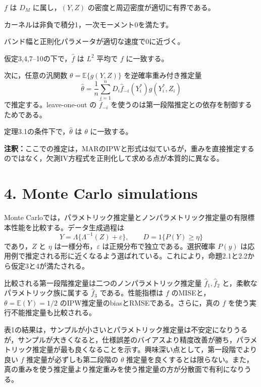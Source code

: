 \documentclass[10pt,a4paper]{article}
\newcommand{\E}{\mathbb{E}}
\newcommand{\note}[1]{\par\smallskip\noindent\textbf{注釈：}#1\par\smallskip}
\begin{document}
\begin{description}[leftmargin=3.2em]
\item[仮定8] $f$ は $D_M$ に属し，$(Y,Z)$ の密度と周辺密度が適切に有界である。
\item[仮定9] カーネルは非負で積分1，一次モーメント0を満たす。
\item[仮定10] バンド幅と正則化パラメータが適切な速度で0に近づく。
\item[定理3.1] 仮定3,4,7--10の下で，$\widehat f$ は $L^2$ 平均で $f$ に一致する。
\end{description}

次に，任意の汎関数 $\theta=\E\{g(Y,Z)\}$ を逆確率重み付き推定量
\[
\widehat\theta=\frac1n\sum_{i=1}^n D_i\widehat f_{-i}(Y_i^*)g(Y_i^*,Z_i)
\]
で推定する。leave-one-out の $\widehat f_{-i}$ を使うのは第一段階推定との依存を制御するためである。

\begin{description}[leftmargin=3.2em]
\item[系3.2] 定理3.1の条件下で，$\widehat\theta$ は $\theta$ に一致する。
\end{description}

\note{ここでの推定は，MARのIPWと形式は似ているが，重みを直接推定するのではなく，欠測IV方程式を正則化して求める点が本質的に異なる。}

\section{4. Monte Carlo simulations}

Monte Carloでは，パラメトリック推定量とノンパラメトリック推定量の有限標本性能を比較する。データ生成過程は
\[
Y=\Lambda\{\Lambda^{-1}(Z)+\varepsilon\},\qquad
D=1\{P(Y)\geq \eta\}
\]
であり，$Z$ と $\eta$ は一様分布，$\varepsilon$ は正規分布で独立である。選択確率 $P(y)$ は応用例で推定される形に近くなるよう選ばれている。これにより，命題2.1と2.2から仮定3と4が満たされる。

比較される第一段階推定量は二つのノンパラメトリック推定量 $\widehat f_1,\widehat f_2$ と，柔軟なパラメトリック族に属する $\widehat f_3$ である。性能指標は $f$ のMISEと，$\theta=\E(Y)=1/2$ のIPW推定量のbiasとRMSEである。さらに，真の $f$ を使う実行不能推定量も比較される。

表1の結果は，サンプルが小さいとパラメトリック推定量は不安定になりうるが，サンプルが大きくなると，仕様誤差のバイアスより精度改善が勝ち，パラメトリック推定量が最も良くなることを示す。興味深い点として，第一段階でより良い $f$ 推定量が必ずしも第二段階の $\theta$ 推定量を良くするとは限らない。また，真の重みを使う推定量より推定重みを使う推定量の方が分散面で有利になりうる。
\end{document}

